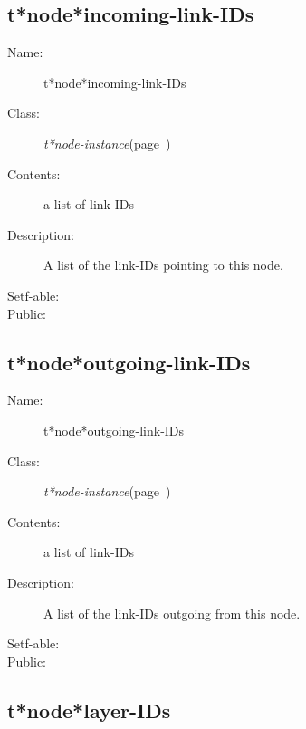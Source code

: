 \subsection{t*node*incoming-link-IDs}
\label{t*node*incoming-link-IDs}

\begin{description}
\item [Name:]  t*node*incoming-link-IDs

\item [Class:] {\sl t*node-instance}\hfill(page~\pageref{t*node-instance})

\item [Contents:] a list of link-IDs

\item [Description:]

A list of the link-IDs pointing to this node.

\item [Setf-able:]


\item [Public:]



\end{description}
\horizontalline

\subsection{t*node*outgoing-link-IDs}
\label{t*node*outgoing-link-IDs}

\begin{description}
\item [Name:]  t*node*outgoing-link-IDs

\item [Class:] {\sl t*node-instance}\hfill(page~\pageref{t*node-instance})

\item [Contents:] a list of link-IDs

\item [Description:]

A list of the link-IDs outgoing from this node.

\item [Setf-able:]


\item [Public:]



\end{description}
\horizontalline

\subsection{t*node*layer-IDs}
\label{t*node*layer-IDs}

